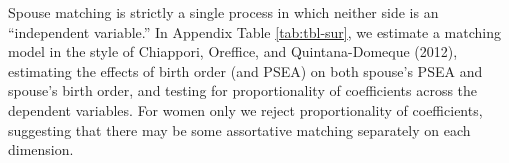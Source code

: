 \documentclass[
]{article}
\begin{document}
Spouse matching is strictly a single process in which neither side is an
``independent variable.'' In Appendix Table \ref{tab:tbl-sur}, we estimate a
matching model in the style of Chiappori, Oreffice, and Quintana-Domeque (2012), estimating the effects of
birth order (and PSEA) on both spouse's PSEA and spouse's birth order, and
testing for proportionality of coefficients across the dependent variables.
For women only we reject proportionality of coefficients, suggesting that there
may be some assortative matching separately on each dimension.

 
  \providecommand{\huxb}[2]{\arrayrulecolor[RGB]{#1}\global\arrayrulewidth=#2pt}
  \providecommand{\huxvb}[2]{\color[RGB]{#1}\vrule width #2pt}
  \providecommand{\huxtpad}[1]{\rule{0pt}{#1}}
  \providecommand{\huxbpad}[1]{\rule[-#1]{0pt}{#1}}
\end{document}
